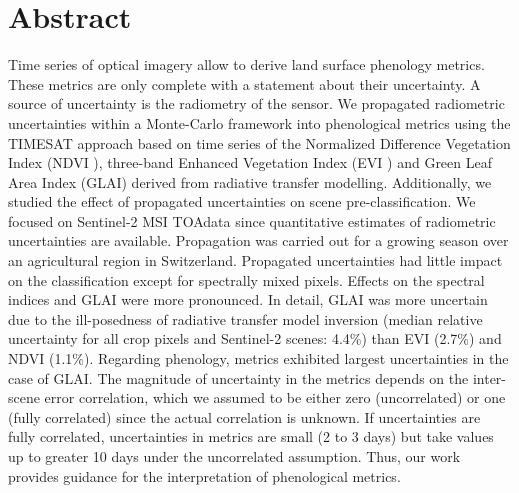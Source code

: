 \section*{Abstract}
Time series of optical imagery allow to derive land surface phenology metrics. These metrics are only complete with a statement about their uncertainty. A source of uncertainty is the radiometry of the sensor. We propagated radiometric uncertainties within a Monte-Carlo framework into phenological metrics using the TIMESAT approach based on time series of the Normalized Difference Vegetation Index (\gls{NDVI} ), three-band Enhanced Vegetation Index (\gls{EVI} ) and Green Leaf Area Index (GLAI) derived from radiative transfer modelling. Additionally, we studied the effect of propagated uncertainties on scene pre-classification. We focused on Sentinel-2 \gls{MSI} \gls{TOA}data since quantitative estimates of radiometric uncertainties are available. Propagation was carried out for a growing season over an agricultural region in Switzerland. Propagated uncertainties had little impact on the classification except for spectrally mixed pixels. Effects on the spectral indices and \gls{GLAI} were more pronounced. In detail, \gls{GLAI} was more uncertain due to the ill-posedness of radiative transfer model inversion (median relative uncertainty for all crop pixels and Sentinel-2 scenes: 4.4\%) than \gls{EVI} (2.7\%) and \gls{NDVI} (1.1\%). Regarding phenology, metrics exhibited largest uncertainties in the case of GLAI. The magnitude of uncertainty in the metrics depends on the inter-scene error correlation, which we assumed to be either zero (uncorrelated) or one (fully correlated) since the actual correlation is unknown. If uncertainties are fully correlated, uncertainties in metrics are small (2 to 3 days) but take values up to greater 10 days under the uncorrelated assumption. Thus, our work provides guidance for the interpretation of phenological metrics.

